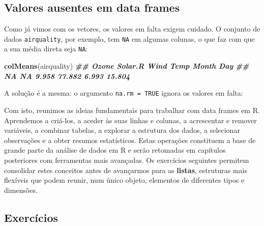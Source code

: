 \documentclass[
  portuguese,
  11pt,
  openany]{book}
\newenvironment{Shaded}{\begin{snugshade}}{\end{snugshade}}
\newcommand{\AttributeTok}[1]{\textcolor[rgb]{0.13,0.29,0.53}{#1}}
\newcommand{\ConstantTok}[1]{\textcolor[rgb]{0.56,0.35,0.01}{#1}}
\newcommand{\DocumentationTok}[1]{\textcolor[rgb]{0.56,0.35,0.01}{\textbf{\textit{#1}}}}
\newcommand{\FunctionTok}[1]{\textcolor[rgb]{0.13,0.29,0.53}{\textbf{#1}}}
\newcommand{\NormalTok}[1]{#1}
\newcommand{\SpecialCharTok}[1]{\textcolor[rgb]{0.81,0.36,0.00}{\textbf{#1}}}
\begin{document}
\subsection{Valores ausentes em data frames}\label{valores-ausentes-em-data-frames}

Como já vimos com os vetores, os valores em falta exigem cuidado. O conjunto de
dados \texttt{airquality}, por exemplo, tem \texttt{NA} em algumas colunas, o que faz com que a
sua média direta seja \texttt{NA}:

\begin{Shaded}
\begin{Highlighting}[]
\FunctionTok{colMeans}\NormalTok{(airquality)}
\DocumentationTok{\#\#   Ozone Solar.R    Wind    Temp   Month     Day }
\DocumentationTok{\#\#      NA      NA   9.958  77.882   6.993  15.804}
\end{Highlighting}
\end{Shaded}

A solução é a mesma: o argumento \texttt{na.rm\ =\ TRUE} ignora os valores em falta:

\begin{Shaded}
\end{Shaded}

Com isto, reunimos as ideias fundamentais para trabalhar com data frames em R. Aprendemos a criá-los, a aceder às suas linhas e colunas, a acrescentar e remover variáveis, a combinar tabelas, a explorar a estrutura dos dados, a selecionar observações e a obter resumos estatísticos. Estas operações constituem a base de grande parte da análise de dados em R e serão retomadas em capítulos posteriores com ferramentas mais avançadas. Os exercícios seguintes permitem consolidar estes conceitos antes de avançarmos para as \textbf{listas}, estruturas mais flexíveis que podem reunir, num único objeto, elementos de diferentes tipos e dimensões.

\subsection{Exercícios}\label{exercuxedcios-4}
\end{document}
